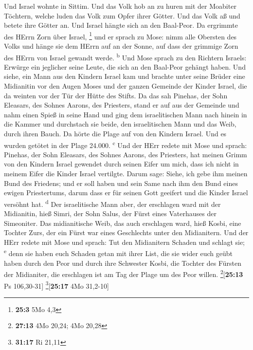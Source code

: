  Und Israel wohnte in Sittim. Und das Volk hob an zu huren
mit der Moabiter Töchtern,  welche luden das Volk zum
Opfer ihrer Götter. Und das Volk aß und betete ihre Götter an.
 Und Israel hängte sich an den Baal-Peor. Da ergrimmte des
HErrn Zorn über Israel, \footnote{\textbf{25:3} 5Mo 4,3} 
und er sprach zu Mose: nimm alle Obersten des Volks und hänge sie dem
HErrn auf an der Sonne, auf dass der grimmige Zorn des HErrn von Israel
gewandt werde. \textsuperscript{b}  Und Mose sprach zu den
Richtern Israels: Erwürge ein jeglicher seine Leute, die sich an den
Baal-Peor gehängt haben.  Und siehe, ein Mann aus den
Kindern Israel kam und brachte unter seine Brüder eine Midianitin vor
den Augen Moses und der ganzen Gemeinde der Kinder Israel, die da
weinten vor der Tür der Hütte des Stifts.  Da das sah
Pinehas, der Sohn Eleasars, des Sohnes Aarons, des Priesters, stand er
auf aus der Gemeinde und nahm einen Spieß in seine Hand 
und ging dem israelitischen Mann nach hinein in die Kammer und
durchstach sie beide, den israelitischen Mann und das Weib, durch ihren
Bauch. Da hörte die Plage auf von den Kindern Israel.  Und
es wurden getötet in der Plage 24.000. \textsuperscript{c}
 Und der HErr redete mit Mose und sprach: 
Pinehas, der Sohn Eleasars, des Sohnes Aarons, des Priesters, hat meinen
Grimm von den Kindern Israel gewendet durch seinen Eifer um mich, dass
ich nicht in meinem Eifer die Kinder Israel vertilgte. 
Darum sage: Siehe, ich gebe ihm meinen Bund des Friedens;
 und er soll haben und sein Same nach ihm den Bund eines
ewigen Priestertums, darum dass er für seinen Gott geeifert und die
Kinder Israel versöhnt hat. \textsuperscript{d}  Der
israelitische Mann aber, der erschlagen ward mit der Midianitin, hieß
Simri, der Sohn Salus, der Fürst eines Vaterhauses der Simeoniter.
 Das midianitische Weib, das auch erschlagen ward, hieß
Kosbi, eine Tochter Zurs, der ein Fürst war eines Geschlechts unter den
Midianitern.  Und der HErr redete mit Mose und sprach:
 Tut den Midianitern Schaden und schlagt sie;
\textsuperscript{e}  denn sie haben euch Schaden getan
mit ihrer List, die sie wider euch geübt haben durch den Peor und durch
ihre Schwester Kosbi, die Tochter des Fürsten der Midianiter, die
erschlagen ist am Tag der Plage um des Peor willen.
\footnote{\textbf{27:13} 4Mo 20,24; 4Mo 20,28}{[}\textbf{25:13} Ps
106,30-31{]} \footnote{\textbf{31:17} Ri 21,11}{[}\textbf{25:17} 4Mo
31,2-10{]}


